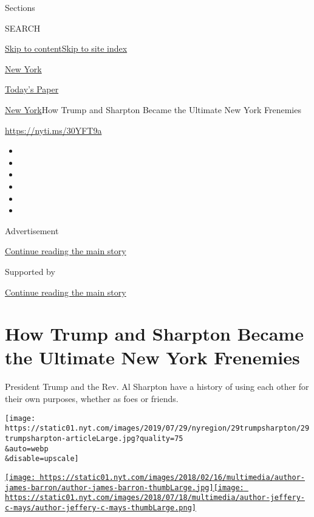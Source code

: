 Sections

SEARCH

\protect\hyperlink{site-content}{Skip to
content}\protect\hyperlink{site-index}{Skip to site index}

\href{https://www.nytimes.com/section/nyregion}{New York}

\href{https://myaccount.nytimes.com/auth/login?response_type=cookie\&client_id=vi}{}

\href{https://www.nytimes.com/section/todayspaper}{Today's Paper}

\href{/section/nyregion}{New York}\textbar{}How Trump and Sharpton
Became the Ultimate New York Frenemies

\url{https://nyti.ms/30YFT9a}

\begin{itemize}
\item
\item
\item
\item
\item
\item
\end{itemize}

Advertisement

\protect\hyperlink{after-top}{Continue reading the main story}

Supported by

\protect\hyperlink{after-sponsor}{Continue reading the main story}

\hypertarget{how-trump-and-sharpton-became-the-ultimate-new-york-frenemies}{%
\section{How Trump and Sharpton Became the Ultimate New York
Frenemies}\label{how-trump-and-sharpton-became-the-ultimate-new-york-frenemies}}

President Trump and the Rev. Al Sharpton have a history of using each
other for their own purposes, whether as foes or friends.

\texttt{[image: https://static01.nyt.com/images/2019/07/29/nyregion/29trumpsharpton/29trumpsharpton-articleLarge.jpg?quality=75\\\&auto=webp\\\&disable=upscale]}

\href{https://www.nytimes.com/by/james-barron}{\texttt{[image: https://static01.nyt.com/images/2018/02/16/multimedia/author-james-barron/author-james-barron-thumbLarge.jpg]}}\href{https://www.nytimes.com/by/jeffery-c-mays}{\texttt{[image: https://static01.nyt.com/images/2018/07/18/multimedia/author-jeffery-c-mays/author-jeffery-c-mays-thumbLarge.png]}}

